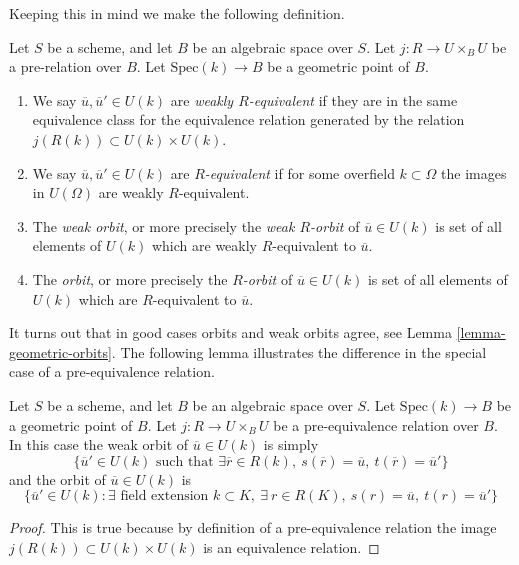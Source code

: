 \medskip\noindent
Keeping this in mind we make the following definition.

\begin{definition}
\label{definition-geometric-orbits}
Let $S$ be a scheme, and let $B$ be an algebraic space over $S$.
Let $j : R \to U \times_B U$ be a pre-relation over $B$.
Let $\text{Spec}(k) \to B$ be a geometric point of $B$.
\begin{enumerate}
\item We say $\overline{u}, \overline{u}' \in U(k)$ are
{\it weakly $R$-equivalent} if they are in the same equivalence class
for the equivalence relation generated by the relation
$j(R(k)) \subset U(k) \times U(k)$.
\item We say $\overline{u}, \overline{u}' \in U(k)$ are
{\it $R$-equivalent} if for some overfield $k \subset \Omega$
the images in $U(\Omega)$ are weakly $R$-equivalent.
\item The {\it weak orbit}, or more precisely the {\it weak $R$-orbit}
of $\overline{u} \in U(k)$ is set of all
elements of $U(k)$ which are weakly $R$-equivalent to $\overline{u}$.
\item The {\it orbit}, or more precisely the {\it $R$-orbit}
of $\overline{u} \in U(k)$ is set of all
elements of $U(k)$ which are $R$-equivalent to $\overline{u}$.
\end{enumerate}
\end{definition}

\noindent
It turns out that in good cases orbits and weak orbits agree, see
Lemma \ref{lemma-geometric-orbits}. The following lemma illustrates
the difference in the special case of a pre-equivalence relation.

\begin{lemma}
\label{lemma-weak-orbit-pre-equivalence}
Let $S$ be a scheme, and let $B$ be an algebraic space over $S$.
Let $\text{Spec}(k) \to B$ be a geometric point of $B$.
Let $j : R \to U \times_B U$ be a pre-equivalence relation over $B$.
In this case the weak orbit of $\overline{u} \in U(k)$ is simply
$$
\{
\overline{u}' \in U(k)
\text{ such that }
\exists \overline{r} \in R(k),
\ s(\overline{r}) = \overline{u},
\ t(\overline{r}) = \overline{u}'
\}
$$
and the orbit of $\overline{u} \in U(k)$ is
$$
\{
\overline{u}' \in U(k) :
\exists\text{ field extension }k \subset K, \ \exists\ r \in R(K),
\ s(r) = \overline{u}, \ t(r) = \overline{u}'\}
$$
\end{lemma}

\begin{proof}
This is true because by definition of a pre-equivalence relation the image
$j(R(k)) \subset U(k) \times U(k)$ is an equivalence relation.
\end{proof}

